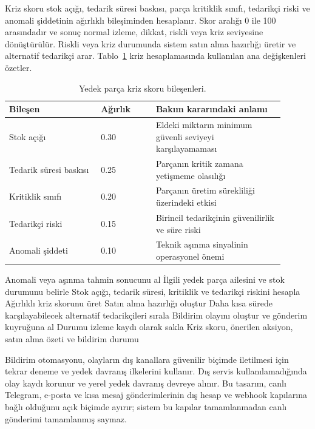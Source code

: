 \documentclass[conference]{IEEEtran}
\begin{document}
Kriz skoru stok açığı, tedarik süresi baskısı, parça kritiklik sınıfı, tedarikçi riski ve anomali şiddetinin ağırlıklı bileşiminden hesaplanır. Skor aralığı 0 ile 100 arasındadır ve sonuç normal izleme, dikkat, riskli veya kriz seviyesine dönüştürülür. Riskli veya kriz durumunda sistem satın alma hazırlığı üretir ve alternatif tedarikçi arar. Tablo~\ref{tab:crisis} kriz hesaplamasında kullanılan ana değişkenleri özetler.

\begin{table}[H]
\centering
\caption{Yedek parça kriz skoru bileşenleri.}
\label{tab:crisis}
\begin{tabular}{p{0.30\linewidth}p{0.18\linewidth}p{0.42\linewidth}}
\toprule
Bileşen & Ağırlık & Bakım kararındaki anlamı \\
\midrule
Stok açığı & 0.30 & Eldeki miktarın minimum güvenli seviyeyi karşılayamaması \\
Tedarik süresi baskısı & 0.25 & Parçanın kritik zamana yetişmeme olasılığı \\
Kritiklik sınıfı & 0.20 & Parçanın üretim sürekliliği üzerindeki etkisi \\
Tedarikçi riski & 0.15 & Birincil tedarikçinin güvenilirlik ve süre riski \\
Anomali şiddeti & 0.10 & Teknik aşınma sinyalinin operasyonel önemi \\
\bottomrule
\end{tabular}
\end{table}

\begin{algorithm}[H]
\caption{Anomaliden Kriz ve Bildirim Aksiyonuna Geçiş}
\begin{algorithmic}[1]
\STATE Anomali veya aşınma tahmin sonucunu al
\STATE İlgili yedek parça ailesini ve stok durumunu belirle
\STATE Stok açığı, tedarik süresi, kritiklik ve tedarikçi riskini hesapla
\STATE Ağırlıklı kriz skorunu üret
  \STATE Satın alma hazırlığı oluştur
  \STATE Daha kısa sürede karşılayabilecek alternatif tedarikçileri sırala
  \STATE Bildirim olayını oluştur ve gönderim kuyruğuna al
\ELSE
  \STATE Durumu izleme kaydı olarak sakla
\ENDIF
\RETURN Kriz skoru, önerilen aksiyon, satın alma özeti ve bildirim durumu
\end{algorithmic}
\end{algorithm}

Bildirim otomasyonu, olayların dış kanallara güvenilir biçimde iletilmesi için tekrar deneme ve yedek davranış ilkelerini kullanır. Dış servis kullanılamadığında olay kaydı korunur ve yerel yedek davranış devreye alınır. Bu tasarım, canlı Telegram, e-posta ve kısa mesaj gönderimlerinin dış hesap ve webhook kapılarına bağlı olduğunu açık biçimde ayırır; sistem bu kapılar tamamlanmadan canlı gönderimi tamamlanmış saymaz.
\end{document}
